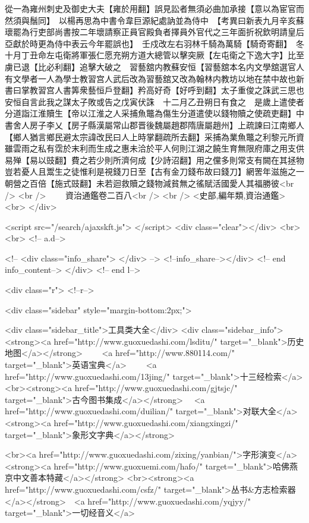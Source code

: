 從一為雍州刺史及御史大夫【雍於用翻】誤見訟者無須必曲加承接【意以為宦官而然須與鬚同】　以楊再思為中書令韋巨源紀處訥並為侍中　【考異曰新表九月辛亥蘇瓌罷為行吏部尚書按二年壞請察正員官殿負者擇員外官代之三年面折祝欽明請皇后亞獻於時更為侍中表云今年罷誤也】　壬戍改左右羽林千騎為萬騎【騎奇寄翻】　冬十月丁丑命左屯衛將軍張仁愿充朔方道大總管以擊突厥【左屯衛之下逸大字】比至虜已退【比必利翻】追擊大破之　習藝舘内教蘇安恒【習藝舘本名内文學舘選官人有文學者一人為學士教習宫人武后改為習藝舘又改為翰林内教坊以地在禁中故也新書曰掌教習宫人書筭衆藝恒戶登翻】矜高好奇【好呼到翻】太子重俊之誅武三思也安恒自言此我之謀太子敗或告之戊寅伏誅　十二月乙丑朔日有食之　是歲上遣使者分道詣江淮贖生【帝以江淮之人采捕魚鼈為傷生分道遣使以錢物贖之使疏吏翻】中書舍人房子李乂【房子縣漢屬常山郡晋後魏屬趙郡隋唐屬趙州】上疏諫曰江南鄉人【鄉人猶言鄉民避太宗諱改民曰人上時掌翻疏所去翻】采捕為業魚鼈之利黎元所資雖雲雨之私有霑於末利而生成之惠未洽於平人何則江湖之饒生育無限府庫之用支供易殚【易以豉翻】費之若少則所濟何成【少詩沼翻】用之儻多則常支有闕在其拯物豈若憂人且鬻生之徒惟利是視錢刀日至【古有金刀錢布故曰錢刀】網罟年滋施之一朝營之百倍【施式豉翻】未若迴救贖之錢物減貧無之徭賦活國愛人其福勝彼<br />
<br />
　　資治通鑑卷二百八<br />
<br />
<史部,編年類,資治通鑑>  <br>
   </div> 

<script src="/search/ajaxskft.js"> </script>
 <div class="clear"></div>
<br>
<br>
 <!-- a.d-->

 <!--
<div class="info_share">
</div> 
-->
 <!--info_share--></div>   <!-- end info_content-->
  </div> <!-- end l-->

<div class="r">   <!--r-->



<div class="sidebar"  style="margin-bottom:2px;">

 
<div class="sidebar_title">工具类大全</div>
<div class="sidebar_info">
<strong><a href="http://www.guoxuedashi.com/lsditu/" target="_blank">历史地图</a></strong>　　
<a href="http://www.880114.com/" target="_blank">英语宝典</a>　　
<a href="http://www.guoxuedashi.com/13jing/" target="_blank">十三经检索</a>　
<br><strong><a href="http://www.guoxuedashi.com/gjtsjc/" target="_blank">古今图书集成</a></strong>　
<a href="http://www.guoxuedashi.com/duilian/" target="_blank">对联大全</a>　<strong><a href="http://www.guoxuedashi.com/xiangxingzi/" target="_blank">象形文字典</a></strong>　

<br><a href="http://www.guoxuedashi.com/zixing/yanbian/">字形演变</a>　　<strong><a href="http://www.guoxuemi.com/hafo/" target="_blank">哈佛燕京中文善本特藏</a></strong>
<br><strong><a href="http://www.guoxuedashi.com/csfz/" target="_blank">丛书&方志检索器</a></strong>　<a href="http://www.guoxuedashi.com/yqjyy/" target="_blank">一切经音义</a>　　

